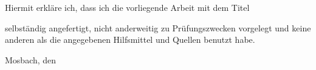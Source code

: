 \pagestyle{empty}

\label{chap:Erklärung}


\vspace*{\fill}


\vspace*{6ex}

\noindent Hiermit erkläre ich, dass ich die vorliegende Arbeit mit dem Titel

\vspace*{4ex}

\noindent{\bf\large\mytitle}

\vspace*{4ex}

\noindent selbständig angefertigt, nicht anderweitig zu Prüfungszwecken vorgelegt und
keine anderen als die angegebenen Hilfsmittel und Quellen benutzt habe.

\vspace*{4ex}
\noindent Mosbach, den \mydate\\[3ex]

\noindent\myname

\vspace*{\fill} 


